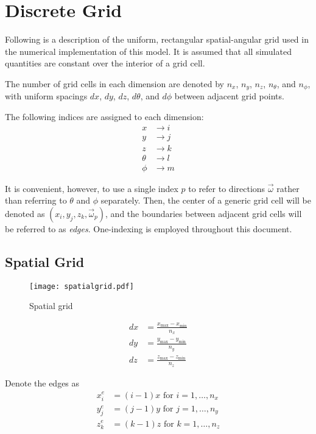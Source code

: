 \section{Discrete Grid}
Following is a description of the uniform, rectangular spatial-angular grid used
in the numerical implementation of this model.
It is assumed that all simulated quantities are constant over the interior of a
grid cell.

The number of grid cells in each dimension are denoted by $n_x$, $n_y$, $n_z$,
$n_\theta$, and $n_\phi$, with uniform spacings $dx$, $dy$, $dz$, $d\theta$, and
$d\phi$ between adjacent grid points.

The following indices are assigned to each dimension:
\begin{align}
  x &\to i \\
  y &\to j \\
  z &\to k \\
  \theta &\to l \\
  \phi &\to m
\end{align}

It is convenient, however, to use a single index $p$ to refer to directions $\vec{\omega}$ rather than referring to $\theta$ and $\phi$ separately.
Then, the center of a generic grid cell will be denoted as
$(x_i, y_j, z_k, \vec{\omega}_p)$, and the boundaries between adjacent grid cells
will be referred to as \textit{edges}.
One-indexing is employed throughout this document.

\subsection{Spatial Grid}
\begin{figure}[H]
  \centering
  \texttt{[image: spatialgrid.pdf]}
  \caption{Spatial grid}
  \label{fig:spatial_grid}
\end{figure}

\begin{align}
  dx &= \frac{x_{\max}-x_{\min}}{n_x} \\ 
  dy &= \frac{y_{\max}-y_{\min}}{n_y} \\ 
  dz &= \frac{z_{\max}-z_{\min}}{n_z}
\end{align}

Denote the edges as 
\begin{align}
  x_i^e &= (i-1)x \mbox{ for } i=1,\ldots,n_x \\
  y_j^e &= (j-1)y \mbox{ for } j=1,\ldots,n_y \\
  z_k^e &= (k-1)z \mbox{ for } k=1,\ldots,n_z 
\end{align}

